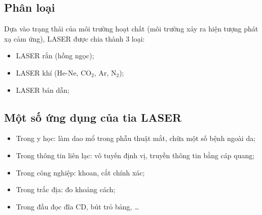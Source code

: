 \subsection{Phân loại}
Dựa vào trạng thái của môi trường hoạt chất (môi trường xảy ra hiện tượng phát xạ cảm ứng), LASER được chia thành 3 loại:
\begin{itemize}
	\item LASER rắn (hồng ngọc);
	\item LASER khí (He-Ne, CO$_2$, Ar, N$_2$);
	\item LASER bán dẫn;
\end{itemize}
\subsection{Một số ứng dụng của tia LASER}
\begin{itemize}
	\item Trong y học: làm dao mổ trong phẫu thuật mắt, chữa một số bệnh ngoài da;
	\item Trong thông tin liên lạc: vô tuyến định vị, truyền thông tin bằng cáp quang;
	\item Trong công nghiệp: khoan, cắt chính xác;
	\item Trong trắc địa: đo khoảng cách;
	\item Trong đầu đọc đĩa CD, bút trỏ bảng, \ldots
\end{itemize}
